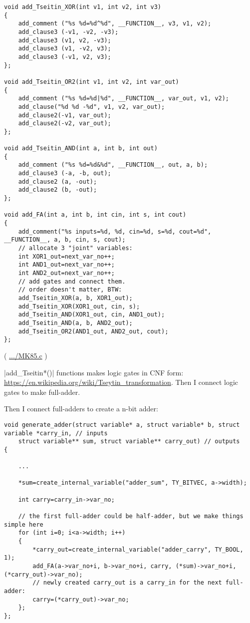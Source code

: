 \begin{lstlisting}
void add_Tseitin_XOR(int v1, int v2, int v3)
{
	add_comment ("%s %d=%d^%d", __FUNCTION__, v3, v1, v2);
	add_clause3 (-v1, -v2, -v3);
	add_clause3 (v1, v2, -v3);
	add_clause3 (v1, -v2, v3);
	add_clause3 (-v1, v2, v3);
};

void add_Tseitin_OR2(int v1, int v2, int var_out)
{
	add_comment ("%s %d=%d|%d", __FUNCTION__, var_out, v1, v2);
	add_clause("%d %d -%d", v1, v2, var_out);
	add_clause2(-v1, var_out);
	add_clause2(-v2, var_out);
};

void add_Tseitin_AND(int a, int b, int out)
{
	add_comment ("%s %d=%d&%d", __FUNCTION__, out, a, b);
	add_clause3 (-a, -b, out);
	add_clause2 (a, -out);
	add_clause2 (b, -out);
};

void add_FA(int a, int b, int cin, int s, int cout)
{
	add_comment("%s inputs=%d, %d, cin=%d, s=%d, cout=%d", __FUNCTION__, a, b, cin, s, cout);
	// allocate 3 "joint" variables:
	int XOR1_out=next_var_no++;
	int AND1_out=next_var_no++;
	int AND2_out=next_var_no++;
	// add gates and connect them.
	// order doesn't matter, BTW:
	add_Tseitin_XOR(a, b, XOR1_out);
	add_Tseitin_XOR(XOR1_out, cin, s);
	add_Tseitin_AND(XOR1_out, cin, AND1_out);
	add_Tseitin_AND(a, b, AND2_out);
	add_Tseitin_OR2(AND1_out, AND2_out, cout);
};
\end{lstlisting}

( \url{.../MK85.c} )

|add\_Tseitin*()| functions makes logic gates in CNF form: \url{https://en.wikipedia.org/wiki/Tseytin_transformation}.
Then I connect logic gates to make full-adder.

Then I connect full-adders to create a n-bit adder:

\begin{lstlisting}
void generate_adder(struct variable* a, struct variable* b, struct variable *carry_in, // inputs
	struct variable** sum, struct variable** carry_out) // outputs
{

	...

	*sum=create_internal_variable("adder_sum", TY_BITVEC, a->width);

	int carry=carry_in->var_no;

	// the first full-adder could be half-adder, but we make things simple here
	for (int i=0; i<a->width; i++)
	{
		*carry_out=create_internal_variable("adder_carry", TY_BOOL, 1);
		add_FA(a->var_no+i, b->var_no+i, carry, (*sum)->var_no+i, (*carry_out)->var_no);
		// newly created carry_out is a carry_in for the next full-adder:
		carry=(*carry_out)->var_no;
	};
};
\end{lstlisting}

